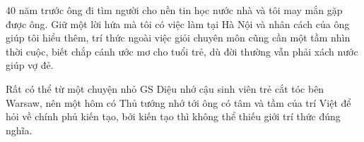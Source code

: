 40 năm trước ông đi tìm người cho nền tin học nước nhà và tôi may mắn gặp được ông. Giữ một lời hứa mà tôi có việc làm tại Hà Nội và nhân cách của ông giúp tôi hiểu thêm, trí thức ngoài việc giỏi chuyên môn cũng cần một tầm nhìn thời cuộc, biết chắp cánh ước mơ cho tuổi trẻ, dù đời thường vẫn phải xách nước giúp vợ đẻ.

Rất có thể từ một chuyện nhỏ GS Diệu nhớ cậu sinh viên trẻ cắt tóc bên Warsaw, nên một hôm có Thủ tướng nhớ tới ông có tâm và tầm của trí Việt để hỏi về chính phủ kiến tạo, bởi kiến tạo thì không thể thiếu giới trí thức đúng nghĩa. 

